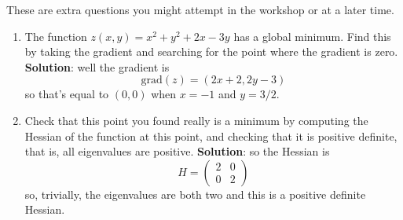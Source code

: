 \documentclass[11pt,a4paper]{scrartcl}
\begin{document}
These are extra questions you might attempt in the workshop or at a later time.

\begin{enumerate}
\item The function $z(x, y) = x^2 + y^2 + 2x - 3y$ has a global minimum. Find this by taking
  the gradient and searching for the point where the gradient is zero. \textbf{Solution}: well the gradient is
  \begin{equation}
    \text{grad}(z)=(2x+2,2y-3)
  \end{equation}
  so that's equal to $(0,0)$ when $x=-1$ and $y=3/2$. 
\item Check that this point you found really is a minimum by computing the Hessian of the
  function at this point, and checking that it is positive definite, that is, all eigenvalues are positive. \textbf{Solution}: so the Hessian is
  \begin{equation}
    H=\left(\begin{array}{cc}2&0\\0&2\end{array}\right)
  \end{equation}
  so, trivially, the eigenvalues are both two and this is a positive definite Hessian.
\end{enumerate}
\end{document}
